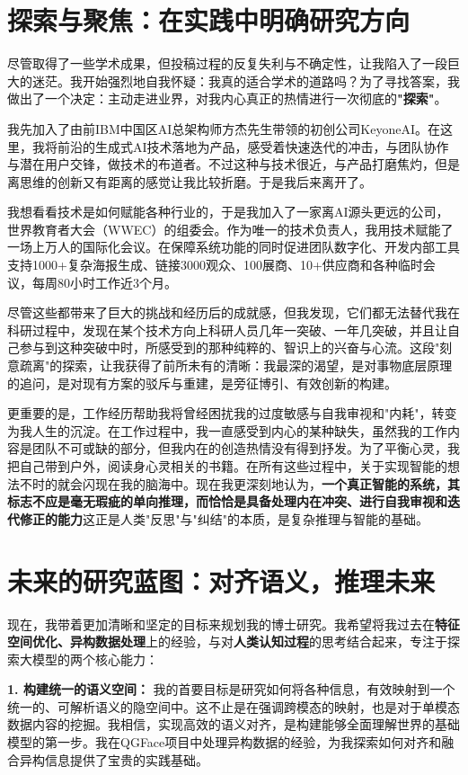\documentclass[11pt, letterpaper]{article}
\begin{document}
\section{探索与聚焦：在实践中明确研究方向}

尽管取得了一些学术成果，但投稿过程的反复失利与不确定性，让我陷入了一段巨大的迷茫。我开始强烈地自我怀疑：我真的适合学术的道路吗？为了寻找答案，我做出了一个决定：主动走进业界，对我内心真正的热情进行一次彻底的\textbf{"探索"}。

我先加入了由前IBM中国区AI总架构师方杰先生带领的初创公司KeyoneAI。在这里，我将前沿的生成式AI技术落地为产品，感受着快速迭代的冲击，与团队协作与潜在用户交锋，做技术的布道者。不过这种与技术很近，与产品打磨焦灼，但是离思维的创新又有距离的感觉让我比较折磨。于是我后来离开了。

我想看看技术是如何赋能各种行业的，于是我加入了一家离AI源头更远的公司，世界教育者大会（WWEC）的组委会\cite{wwec}。作为唯一的技术负责人，我用技术赋能了一场上万人的国际化会议。在保障系统功能的同时促进团队数字化、开发内部工具支持1000+复杂海报生成、链接3000观众、100展商、10+供应商和各种临时会议，每周80小时工作近3个月。

尽管这些都带来了巨大的挑战和经历后的成就感，但我发现，它们都无法替代我在科研过程中，发现在某个技术方向上科研人员几年一突破、一年几突破，并且让自己参与到这种突破中时，所感受到的那种纯粹的、智识上的兴奋与心流。这段"刻意疏离"的探索，让我获得了前所未有的清晰：我最深的渴望，是对事物底层原理的追问，是对现有方案的驳斥与重建，是旁征博引、有效创新的构建。

更重要的是，工作经历帮助我将曾经困扰我的过度敏感与自我审视和"内耗"，转变为我人生的沉淀。在工作过程中，我一直感受到内心的某种缺失，虽然我的工作内容是团队不可或缺的部分，但我内在的创造热情没有得到抒发。为了平衡心灵，我把自己带到户外，阅读身心灵相关的书籍。在所有这些过程中，关于实现智能的想法不时的就会闪现在我的脑海中。现在我更深刻地认为，\textbf{一个真正智能的系统，其标志不应是毫无瑕疵的单向推理，而恰恰是具备处理内在冲突、进行自我审视和迭代修正的能力}这正是人类"反思"与"纠结"的本质，是复杂推理与智能的基础。

\section{未来的研究蓝图：对齐语义，推理未来}

现在，我带着更加清晰和坚定的目标来规划我的博士研究。我希望将我过去在\textbf{特征空间优化、异构数据处理}上的经验，与对\textbf{人类认知过程}的思考结合起来，专注于探索大模型的两个核心能力：

\textbf{1. 构建统一的语义空间：} 我的首要目标是研究如何将各种信息，有效映射到一个统一的、可解析语义的隐空间中。这不止是在强调跨模态的映射，也是对于单模态数据内容的挖掘。我相信，实现高效的语义对齐，是构建能够全面理解世界的基础模型的第一步。我在QGFace项目中处理异构数据的经验，为我探索如何对齐和融合异构信息提供了宝贵的实践基础。
\end{document}
